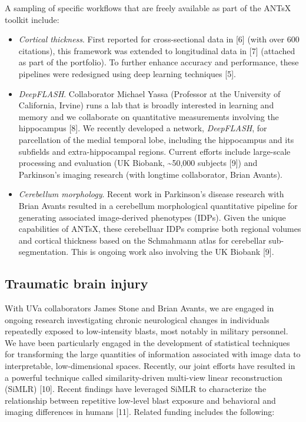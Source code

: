 \documentclass[
  11pt,
]{article}
\begin{document}
A sampling of specific workflows that are freely available as part of
the ANTsX toolkit include:

\begin{itemize}
\item
  \emph{Cortical thickness}. First reported for cross-sectional data in
  {[}6{]} (with over 600 citations), this framework was extended to
  longitudinal data in {[}7{]} (attached as part of the portfolio). To
  further enhance accuracy and performance, these pipelines were
  redesigned using deep learning techniques {[}5{]}.
\item
  \emph{DeepFLASH}. Collaborator Michael Yassa (Professor at the
  University of California, Irvine) runs a lab that is broadly
  interested in learning and memory and we collaborate on quantitative
  measurements involving the hippocampus {[}8{]}. We recently developed
  a network, \emph{DeepFLASH}, for parcellation of the medial temporal
  lobe, including the hippocampus and its subfields and
  extra-hippocampal regions. Current efforts include large-scale
  processing and evaluation (UK Biobank, \textasciitilde50,000 subjects
  {[}9{]}) and Parkinson's imaging research (with longtime collaborator,
  Brian Avants).
\item
  \emph{Cerebellum morphology}. Recent work in Parkinson's disease
  research with Brian Avants resulted in a cerebellum morphological
  quantitative pipeline for generating associated image-derived
  phenotypes (IDPs). Given the unique capabilities of ANTsX, these
  cerebelluar IDPs comprise both regional volumes and cortical thickness
  based on the Schmahmann atlas for cerebellar sub-segmentation. This is
  ongoing work also involving the UK Biobank {[}9{]}.
\end{itemize}

\hypertarget{traumatic-brain-injury}{%
\subsection{Traumatic brain injury}\label{traumatic-brain-injury}}

With UVa collaborators James Stone and Brian Avants, we are engaged in
ongoing research investigating chronic neurological changes in
individuals repeatedly exposed to low-intensity blasts, most notably in
military personnel. We have been particularly engaged in the development
of statistical techniques for transforming the large quantities of
information associated with image data to interpretable, low-dimensional
spaces. Recently, our joint efforts have resulted in a powerful
technique called similarity-driven multi-view linear reconstruction
(SiMLR) {[}10{]}. Recent findings have leveraged SiMLR to characterize
the relationship between repetitive low-level blast exposure and
behavioral and imaging differences in humans {[}11{]}. Related funding
includes the following:
\end{document}
